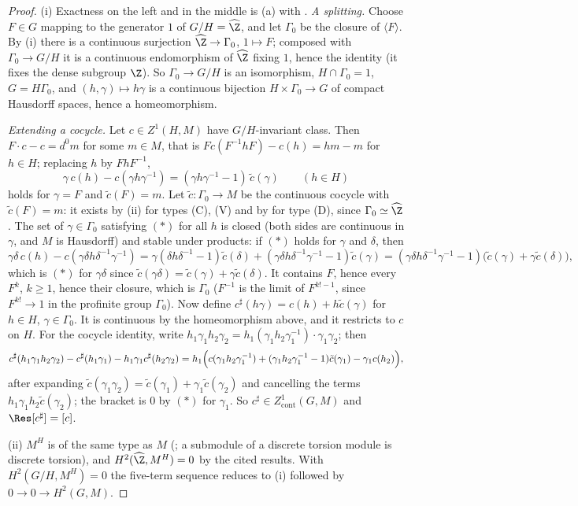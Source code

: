 \begin{proof}
(i) Exactness on the left and in the middle is (a) with . \emph{A splitting.} Choose $F\in G$ mapping to the
generator $1$ of $G/H=\widehat\Z$, and let $\Gamma_0$ be the closure of $\langle F\rangle$. By (i) there is a continuous surjection
$\widehat\Z\to\Gamma_0$, $1\mapsto F$; composed with $\Gamma_0\to G/H$ it is a continuous endomorphism of $\widehat\Z$ fixing $1$, hence the identity (it fixes the dense subgroup
$\Z$). So $\Gamma_0\to G/H$ is an isomorphism, $H\cap\Gamma_0=1$, $G=H\Gamma_0$, and $(h,\gamma)\mapsto h\gamma$ is a continuous bijection $H\times\Gamma_0\to G$ of compact
Hausdorff spaces, hence a homeomorphism.

\emph{Extending a cocycle.} Let $c\in Z^1(H,M)$ have $G/H$-invariant class. Then $F\cdot c-c=d^0m$ for some $m\in M$, that is $Fc(F^{-1}hF)-c(h)=hm-m$ for $h\in H$; replacing $h$
by $FhF^{-1}$,
\[
\gamma\,c(h)-c(\gamma h\gamma^{-1})=(\gamma h\gamma^{-1}-1)\,\tilde c(\gamma)\qquad(h\in H)\tag{$*$}
\]
holds for $\gamma=F$ and $\tilde c(F)=m$. Let $\tilde c\colon\Gamma_0\to M$ be the continuous cocycle with $\tilde c(F)=m$: it exists by (ii) for
types (C), (V) and by  for type (D), since $\Gamma_0\simeq\widehat\Z$. The set of $\gamma\in\Gamma_0$ satisfying $(*)$ for all $h$ is closed
(both sides are continuous in $\gamma$, and $M$ is Hausdorff) and stable under products: if $(*)$ holds for $\gamma$ and $\delta$, then
\[
\gamma\delta\,c(h)-c(\gamma\delta h\delta^{-1}\gamma^{-1})=\gamma(\delta h\delta^{-1}-1)\tilde c(\delta)+(\gamma\delta h\delta^{-1}\gamma^{-1}-1)\tilde c(\gamma)
=(\gamma\delta h\delta^{-1}\gamma^{-1}-1)\bigl(\tilde c(\gamma)+\gamma\tilde c(\delta)\bigr),
\]
which is $(*)$ for $\gamma\delta$ since $\tilde c(\gamma\delta)=\tilde c(\gamma)+\gamma\tilde c(\delta)$. It contains $F$, hence every $F^k$, $k\ge1$, hence their closure, which is $\Gamma_0$
($F^{-1}$ is the limit of $F^{k!-1}$, since $F^{k!}\to1$ in the profinite group $\Gamma_0$). Now define $c^\sharp(h\gamma)=c(h)+h\tilde c(\gamma)$ for $h\in H$, $\gamma\in\Gamma_0$. It is
continuous by the homeomorphism above, and it restricts to $c$ on $H$. For the cocycle identity, write $h_1\gamma_1h_2\gamma_2=h_1(\gamma_1h_2\gamma_1^{-1})\cdot\gamma_1\gamma_2$; then
\[
c^\sharp(h_1\gamma_1h_2\gamma_2)-c^\sharp(h_1\gamma_1)-h_1\gamma_1c^\sharp(h_2\gamma_2)
=h_1\Bigl(c(\gamma_1h_2\gamma_1^{-1})+(\gamma_1h_2\gamma_1^{-1}-1)\tilde c(\gamma_1)-\gamma_1c(h_2)\Bigr),
\]
after expanding $\tilde c(\gamma_1\gamma_2)=\tilde c(\gamma_1)+\gamma_1\tilde c(\gamma_2)$ and cancelling the terms $h_1\gamma_1h_2\tilde c(\gamma_2)$; the bracket is $0$ by $(*)$ for $\gamma_1$. So
$c^\sharp\in Z^1_{\mathrm{cont}}(G,M)$ and $\Res[c^\sharp]=[c]$.

(ii) $M^H$ is of the same type as $M$ (; a submodule of a discrete torsion module is discrete torsion), and
$H^2(\widehat\Z,M^H)=0$ by the cited results. With $H^2(G/H,M^H)=0$ the five-term sequence reduces to (i) followed by $0\to0\to H^2(G,M)$.
\end{proof}

